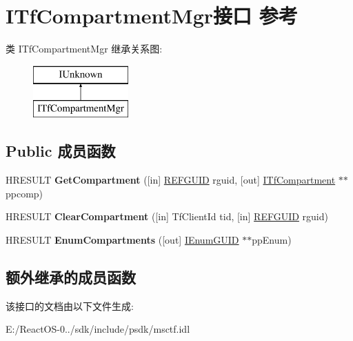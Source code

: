 \hypertarget{interface_i_tf_compartment_mgr}{}\section{I\+Tf\+Compartment\+Mgr接口 参考}
\label{interface_i_tf_compartment_mgr}
类 I\+Tf\+Compartment\+Mgr 继承关系图\+:\begin{figure}[H]
\begin{center}
\leavevmode
\includegraphics[height=2.000000cm]{interface_i_tf_compartment_mgr}
\end{center}
\end{figure}
\subsection*{Public 成员函数}
\begin{DoxyCompactItemize}
\item 
\mbox{\label{interface_i_tf_compartment_mgr_afcc6f91d7117e253c4731f751f7c7b49}} 
H\+R\+E\+S\+U\+LT {\bfseries Get\+Compartment} (\mbox{[}in\mbox{]} \hyperlink{struct___g_u_i_d}{R\+E\+F\+G\+U\+ID} rguid, \mbox{[}out\mbox{]} \hyperlink{interface_i_tf_compartment}{I\+Tf\+Compartment} $\ast$$\ast$ppcomp)
\item 
\mbox{\label{interface_i_tf_compartment_mgr_a8792d9c2837b42e2d0e9e9b3d3652263}} 
H\+R\+E\+S\+U\+LT {\bfseries Clear\+Compartment} (\mbox{[}in\mbox{]} Tf\+Client\+Id tid, \mbox{[}in\mbox{]} \hyperlink{struct___g_u_i_d}{R\+E\+F\+G\+U\+ID} rguid)
\item 
\mbox{\label{interface_i_tf_compartment_mgr_a6c1f63d72e9eb90644a0bf0ea72063de}} 
H\+R\+E\+S\+U\+LT {\bfseries Enum\+Compartments} (\mbox{[}out\mbox{]} \hyperlink{interface_i_enum_g_u_i_d}{I\+Enum\+G\+U\+ID} $\ast$$\ast$pp\+Enum)
\end{DoxyCompactItemize}
\subsection*{额外继承的成员函数}


该接口的文档由以下文件生成\+:\begin{DoxyCompactItemize}
\item 
E\+:/\+React\+O\+S-\/0../sdk/include/psdk/msctf.\+idl\end{DoxyCompactItemize}

